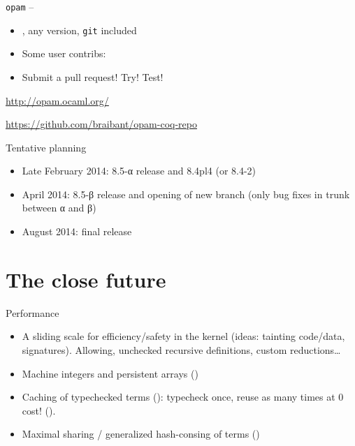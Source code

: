 \begin{subsecframe}{\texttt{opam} -- }
  
  \begin{itemize}
  \item {}, any version, \texttt{git} included
  \item Some user contribs: 
  \item Submit a pull request! Try! Test!
  \end{itemize}

  \begin{center}
    \url{http://opam.ocaml.org/}
    \vspace{0.5em}

    \url{https://github.com/braibant/opam-coq-repo}
  \end{center}
\end{subsecframe}

\begin{subsecframe}{Tentative planning}
  \begin{itemize}
  \item Late February 2014: 8.5-α release and 8.4pl4 (or 8.4-2)
  \item April 2014: 8.5-β release and opening of new branch
    (only bug fixes in trunk between α and β)
  \item August 2014: final release
  \end{itemize}
\end{subsecframe}


\section{The close future}

\begin{subsecframe}{Performance}

  \begin{itemize}
  \item A sliding scale for efficiency/safety in the kernel (ideas:
    tainting code/data, signatures). Allowing, unchecked recursive
    definitions, custom reductions\dots
  \item Machine integers and persistent arrays ()
  \item Caching of typechecked terms ():
    typecheck once, reuse as many times at 0 cost! ().
  \item Maximal sharing / generalized hash-consing of terms ()
  \end{itemize}
  
\end{subsecframe}

